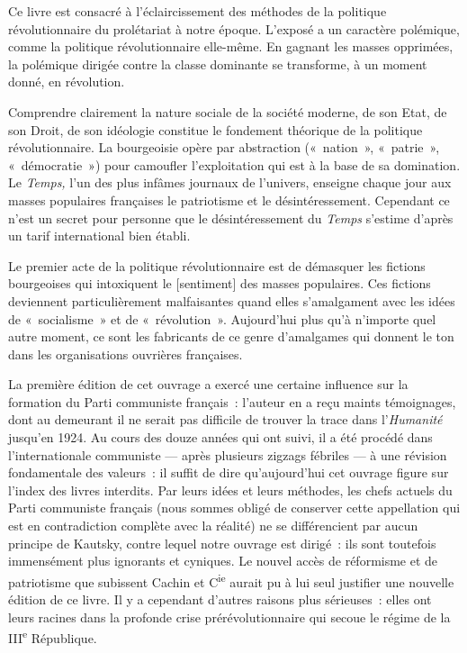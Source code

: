 \documentclass[french,twoside]{book} %
\newcommand\corr[1]{#1}
\newcommand\chaptercont{} %
\begin{document}

\chaptercont
\noindent Ce livre est consacré à l’éclaircissement des méthodes de la politique révolutionnaire du prolétariat à notre époque. L’exposé a un caractère polémique, comme la politique révolutionnaire elle-même. En gagnant les masses opprimées, la polémique dirigée contre la classe dominante se transforme, à un moment donné, en révolution.\par
Comprendre clairement la nature sociale de la société moderne, de son Etat, de son Droit, de son idéologie constitue le fondement théorique de la politique révolutionnaire. La bourgeoisie opère par abstraction (« nation », « patrie », « démocratie ») pour camoufler l’exploitation qui est à la base de sa domination. Le \emph{Temps,} l’un des plus infâmes journaux de l’univers, enseigne chaque jour aux masses populaires françaises le patriotisme et le désintéressement. Cependant ce n’est un secret pour personne que le désintéressement du \emph{Temps} s’estime d’après un tarif international bien établi.\par
Le premier acte de la politique révolutionnaire est de démasquer les fictions bourgeoises qui intoxiquent le [{\corr sentiment}] des masses populaires. Ces fictions deviennent  particulièrement malfaisantes quand elles s’amalgament avec les idées de « socialisme » et de « révolution ». Aujourd’hui plus qu’à n’importe quel autre moment, ce sont les fabricants de ce genre d’amalgames qui donnent le ton dans les organisations ouvrières françaises.\par
La première édition de cet ouvrage a exercé une certaine influence sur la formation du Parti communiste français : l’auteur en a reçu maints témoignages, dont au demeurant il ne serait pas difficile de trouver la trace dans l’\emph{Humanité} jusqu’en 1924. Au cours des douze années qui ont suivi, il a été procédé dans l’internationale communiste — après plusieurs zigzags fébriles — à une révision fondamentale des valeurs : il suffit de dire qu’aujourd’hui cet ouvrage figure sur l’index des livres interdits. Par leurs idées et leurs méthodes, les chefs actuels du Parti communiste français (nous sommes obligé de conserver cette appellation qui est en contradiction complète avec la réalité) ne se différencient par aucun principe de Kautsky, contre lequel notre ouvrage est dirigé : ils sont toutefois immensément plus ignorants et cyniques. Le nouvel accès de réformisme et de patriotisme que subissent Cachin et C\textsuperscript{ie} aurait pu à lui seul justifier une nouvelle édition de ce livre. Il y a cependant d’autres raisons plus sérieuses : elles ont leurs racines dans la profonde crise prérévolutionnaire qui secoue le régime de la III\textsuperscript{e} République.\par
\end{document}
